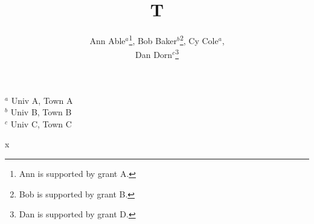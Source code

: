 \documentclass{article}
\begin{document}
\title{T}
\author{Ann Able$^{a }$\footnote{Ann is supported by grant A.}, Bob Baker$^{b }$\footnote{Bob is supported by
grant B.}, Cy Cole\hskip 1pt$^{a }$\footnotemark[1], \\Dan Dorn$^{c }$\footnote{Dan is supported by grant D.}}
\date{}
\maketitle
\begin{center}
$^a$ Univ A, Town A\\
$^b$ Univ B, Town B\\
$^c$ Univ C, Town C
\end{center}
x
\end{document}
